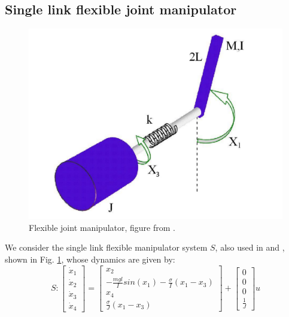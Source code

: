 


\subsection{Single link flexible joint manipulator}
\label{sec:manipulator}

\begin{figure}
	\centering
	\includegraphics[scale=0.15]{figs/ManipArm.pdf}
	\caption{Flexible joint manipulator, figure from \cite{intech}.}
	\label{fig:manipulator fig}
\end{figure}

We consider the single link flexible manipulator system $S$, also used in  \cite{parameter} and \cite{intech}, shown in Fig. \ref{fig:manipulator fig}, whose dynamics are given by:
\begin{equation}
S: \begin{bmatrix} \dot{x}_1 \\ \dot{x}_2 \\ \dot{x}_3 \\ \dot{x}_4    \end{bmatrix} = \begin{bmatrix} x_2 \\ -\frac{mgl}{I}sin(x_1) - \frac{\sigma}{I}(x_1-x_3)  \\ x_4 \\ \frac{\sigma}{J}(x_1-x_3)  \end{bmatrix} + \begin{bmatrix} 0 \\ 0 \\ 0 \\ \frac{1}{J} \end{bmatrix}u \nonumber
\end{equation}

